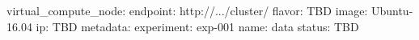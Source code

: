 virtual\_compute\_node:
  endpoint: http://.../cluster/
  flavor: TBD
  image: Ubuntu-16.04
  ip:
  \- TBD
  metadata:
    experiment: exp-001
  name: data
  status: TBD
